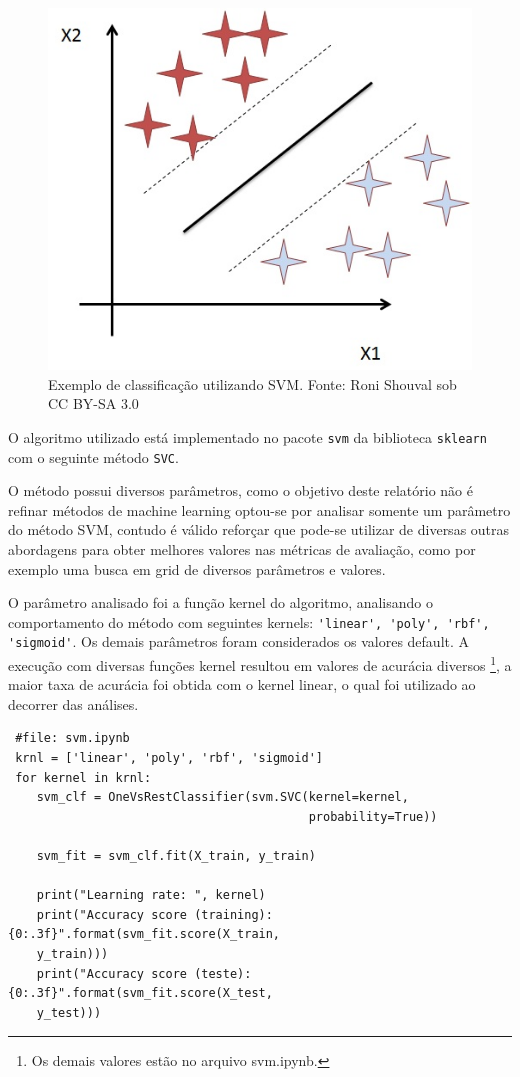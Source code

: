 \documentclass[
	article,			%
	11pt,				%
	oneside,			%
	a4paper,			%
	english,			%
	brazil,				%
	sumario=tradicional
	]{abntex2}
\begin{document}
\begin{figure}[H]
 \centering
 \includegraphics[scale=0.6]{fig/svm_alg.jpg}
 \caption{Exemplo de classificação utilizando SVM.  Fonte: Roni Shouval sob CC BY-SA 3.0}
 \label{fig:svm_alg}
\end{figure}

O algoritmo utilizado está implementado no pacote \verb|svm| da biblioteca \verb|sklearn| com o seguinte método \verb|SVC|. 

O método possui diversos parâmetros, como o objetivo deste relatório não é refinar métodos de machine learning optou-se por analisar somente um parâmetro do método SVM, contudo é válido reforçar que pode-se utilizar de diversas outras abordagens para obter melhores valores nas métricas de avaliação, como por exemplo uma busca em grid de diversos parâmetros e valores.

O parâmetro analisado foi a função kernel do algoritmo, analisando o comportamento do método com seguintes kernels: \verb|'linear', 'poly', 'rbf', 'sigmoid'|. Os demais parâmetros foram considerados os valores default. A execução com diversas funções kernel resultou em valores de acurácia diversos 
\footnote{Os demais valores estão no arquivo svm.ipynb.}, a maior taxa de acurácia foi obtida com o kernel linear, o qual foi utilizado ao decorrer das análises. 

\begin{verbatim}
 #file: svm.ipynb
 krnl = ['linear', 'poly', 'rbf', 'sigmoid']
 for kernel in krnl:
    svm_clf = OneVsRestClassifier(svm.SVC(kernel=kernel,
                                          probability=True))

    svm_fit = svm_clf.fit(X_train, y_train)

    print("Learning rate: ", kernel)
    print("Accuracy score (training): {0:.3f}".format(svm_fit.score(X_train,
    y_train)))
    print("Accuracy score (teste): {0:.3f}".format(svm_fit.score(X_test,
    y_test)))
\end{verbatim}
\end{document}
